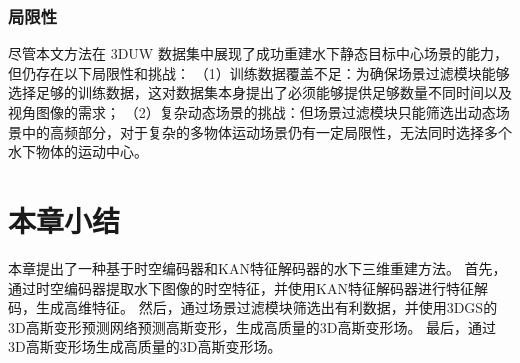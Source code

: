 \subsubsection{局限性}
尽管本文方法在 3DUW 数据集中展现了成功重建水下静态目标中心场景的能力，但仍存在以下局限性和挑战：
（1）训练数据覆盖不足：为确保场景过滤模块能够选择足够的训练数据，这对数据集本身提出了必须能够提供足够数量不同时间以及视角图像的需求；
（2）复杂动态场景的挑战：但场景过滤模块只能筛选出动态场景中的高频部分，对于复杂的多物体运动场景仍有一定局限性，无法同时选择多个水下物体的运动中心。

\section{本章小结}
本章提出了一种基于时空编码器和KAN特征解码器的水下三维重建方法。
首先，通过时空编码器提取水下图像的时空特征，并使用KAN特征解码器进行特征解码，生成高维特征。
然后，通过场景过滤模块筛选出有利数据，并使用3DGS\cite{3DGS}的3D高斯变形预测网络预测高斯变形，生成高质量的3D高斯变形场。
最后，通过3D高斯变形场生成高质量的3D高斯变形场。


